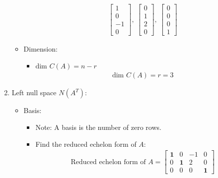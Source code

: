 \documentclass[10pt,a4paper]{article}
\begin{document}
\begin{enumerate}
\begin{itemize}
\begin{itemize}
\begin{align*}
                \begin{bmatrix}
                    1 \\
                    0 \\
                    -1 \\
                    0
                \end{bmatrix}, \: 
                \begin{bmatrix}
                    0 \\
                    1 \\
                    2 \\
                    0
                \end{bmatrix}, \:
                \begin{bmatrix}
                    0 \\
                    0 \\
                    0 \\
                    1
                \end{bmatrix}
            \end{align*}
        \end{itemize}
        \item Dimension:
        \begin{itemize}
            \item $\text{dim }C(A) = n-r$
            \begin{align*}
                \text{dim }C(A) = r = 3 
            \end{align*}
        \end{itemize}
    \end{itemize}
    \item Left null space $N(A^T)$: 
    \begin{itemize}
        \item Basis:
        \begin{itemize}
            \item Note: A basis is the number of zero rows.
            \item Find the reduced echelon form of $A$:
            \begin{align*}
                \text{Reduced echelon form of }A = 
                \begin{bmatrix}
                    \textbf{1}&0&-1&0 \\
                    0&\textbf{1}&2&0 \\
                    0&0&0&\textbf{1}
                \end{bmatrix}

\end{align*}
\end{itemize}
\end{itemize}
\end{enumerate}
\end{document}
